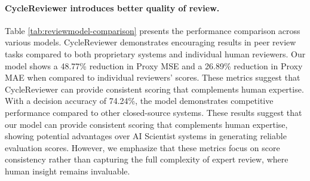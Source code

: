 \documentclass{article} %
\begin{document}
\begin{table}
\centering
\vspace{-0.7cm}
\caption{Comparison of automated models on generating review.}

\label{tab:reviewmodel-comparison}
\end{table}

\paragraph{CycleReviewer introduces better quality of review.}

Table \ref{tab:reviewmodel-comparison} presents the performance comparison across various models. CycleReviewer demonstrates encouraging results in peer review tasks compared to both proprietary systems and individual human reviewers. Our model shows a 48.77\% reduction in Proxy MSE and a 26.89\% reduction in Proxy MAE when compared to individual reviewers' scores. These metrics suggest that CycleReviewer can provide consistent scoring that complements human expertise. With a decision accuracy of 74.24\%, the model demonstrates competitive performance compared to other closed-source systems. These results suggest that our model can provide consistent scoring that complements human expertise, showing potential advantages over AI Scientist systems \citep{lu2024ai} in generating reliable evaluation scores. However, we emphasize that these metrics focus on score consistency rather than capturing the full complexity of expert review, where human insight remains invaluable.
\end{document}
